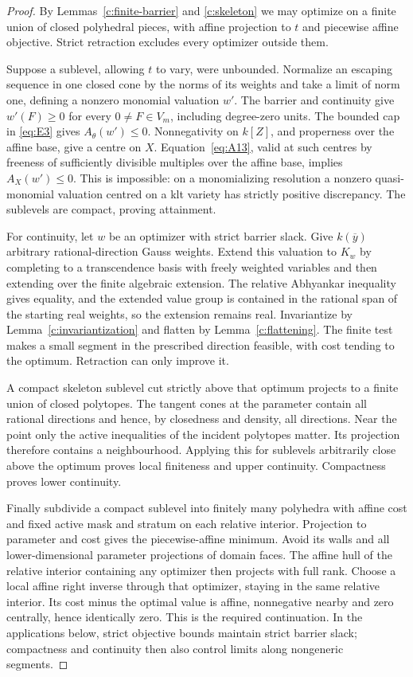 \begin{proof}
By Lemmas~\ref{c:finite-barrier} and \ref{c:skeleton} we may optimize
on a finite union of closed polyhedral pieces, with affine
projection to \(t\) and piecewise affine objective.  Strict
retraction excludes every optimizer outside them.

Suppose a sublevel, allowing \(t\) to vary, were unbounded.
Normalize an escaping sequence in one closed cone by the norms
of its weights and take a limit of norm one, defining a nonzero
monomial valuation \(w'\).  The barrier and continuity give
\(w'(F)\ge0\) for every \(0\ne F\in V_m\), including degree-zero
units.  The bounded cap in \eqref{eq:E3} gives
\(A_\theta(w')\le0\).  Nonnegativity on \(k[Z]\), and properness
over the affine base, give a centre on \(X\).
Equation~\eqref{eq:A13}, valid at such centres by freeness of
sufficiently divisible multiples over the affine base, implies
\(A_X(w')\le0\).  This is impossible: on a monomializing resolution
a nonzero quasi-monomial valuation centred on a klt variety has
strictly positive discrepancy.  The sublevels are compact, proving
attainment.

For continuity, let \(w\) be an optimizer with strict barrier
slack.  Give \(k(\overline y)\) arbitrary rational-direction
Gauss weights.  Extend this valuation to \(K_w\) by completing
to a transcendence basis with freely weighted variables and then
extending over the finite algebraic extension.  The relative
Abhyankar inequality gives equality, and the extended value
group is contained in the rational span of the starting real
weights, so the extension remains real.  Invariantize by
Lemma~\ref{c:invariantization} and flatten by
Lemma~\ref{c:flattening}.  The finite test makes a small segment
in the prescribed direction feasible, with cost tending to the
optimum.  Retraction can only improve it.

A compact skeleton sublevel cut strictly above that optimum
projects to a finite union of closed polytopes.  The tangent
cones at the parameter contain all rational directions and hence,
by closedness and density, all directions.  Near the point only
the active inequalities of the incident polytopes matter.
Its projection therefore contains a neighbourhood.  Applying
this for sublevels arbitrarily close above the optimum proves
local finiteness and upper continuity.  Compactness proves lower
continuity.

Finally subdivide a compact sublevel into finitely many polyhedra
with affine cost and fixed active mask and stratum on each
relative interior.  Projection to parameter and cost gives the
piecewise-affine minimum.  Avoid its walls and all
lower-dimensional parameter projections of domain faces.
The affine hull of the relative interior containing any
optimizer then projects with full rank.  Choose a local affine
right inverse through that optimizer, staying in the same
relative interior.  Its cost minus the optimal value is affine,
nonnegative nearby and zero centrally, hence identically zero.
This is the required continuation.  In the applications below,
strict objective bounds maintain strict barrier slack; compactness
and continuity then also control limits along nongeneric segments.
\end{proof}


